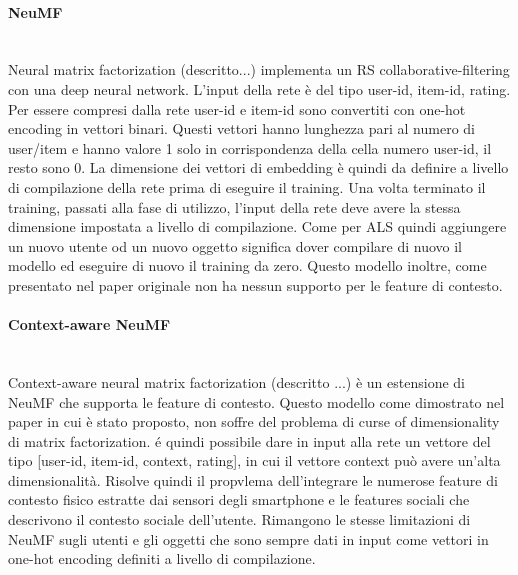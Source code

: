 \documentclass[12pt,italian]{report}
\newcommand{\myparagraph}[1]{\paragraph{#1}\mbox{}\\}
\begin{document}
\myparagraph{NeuMF}
Neural matrix factorization (descritto...) implementa un RS
collaborative-filtering con una deep neural network. L'input della 
rete è del tipo user-id, item-id, rating. Per essere compresi 
dalla rete user-id e item-id sono convertiti con one-hot encoding in 
vettori binari. Questi vettori hanno lunghezza pari al numero di 
user/item e hanno valore 1 solo in corrispondenza della cella numero 
user-id, il resto sono 0. La dimensione dei vettori di embedding è quindi da definire a livello di compilazione della rete prima di eseguire il training. Una volta terminato il training, passati alla fase di utilizzo, l'input della rete deve avere la stessa dimensione impostata a livello di compilazione. Come per ALS quindi aggiungere un nuovo utente od un nuovo oggetto significa dover compilare di nuovo il modello ed eseguire di nuovo il training da zero. Questo modello inoltre, come presentato nel paper originale \cite{NCF} non ha nessun supporto per le feature di contesto.

\myparagraph{Context-aware NeuMF}
Context-aware neural matrix factorization (descritto ...) è un estensione di NeuMF che supporta le feature di contesto. Questo modello come dimostrato nel paper in cui è stato proposto, non soffre del problema di curse of dimensionality di matrix factorization. é quindi possibile dare in input alla rete un vettore del tipo [user-id, item-id, context, rating], in cui il vettore context può avere un'alta dimensionalità. Risolve quindi il propvlema dell'integrare le numerose feature di contesto fisico estratte dai sensori degli smartphone e le features sociali che descrivono il contesto sociale dell'utente. Rimangono le stesse limitazioni di NeuMF sugli utenti e gli oggetti che sono sempre dati in input come vettori in one-hot encoding definiti a livello di compilazione.
\end{document}
